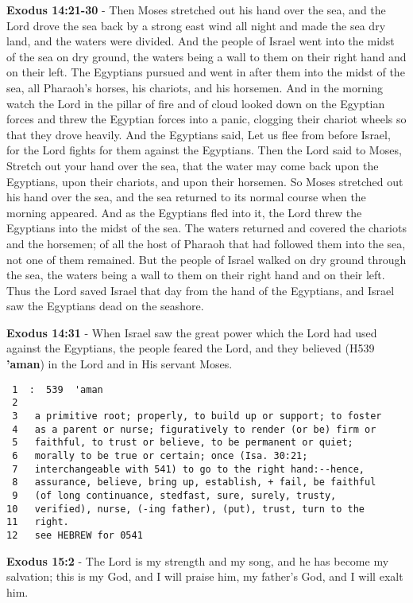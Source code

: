 \documentclass[11pt]{article}
\begin{document}
\textbf{Exodus 14:21-30} - Then Moses stretched out his hand over the sea, and the Lord drove the sea back by a strong east wind all night and made the sea dry land, and the waters were divided. And the people of Israel went into the midst of the sea on dry ground, the waters being a wall to them on their right hand and on their left. The Egyptians pursued and went in after them into the midst of the sea, all Pharaoh's horses, his chariots, and his horsemen. And in the morning watch the Lord in the pillar of fire and of cloud looked down on the Egyptian forces and threw the Egyptian forces into a panic, clogging their chariot wheels so that they drove heavily. And the Egyptians said, Let us flee from before Israel, for the Lord fights for them against the Egyptians. Then the Lord said to Moses, Stretch out your hand over the sea, that the water may come back upon the Egyptians, upon their chariots, and upon their horsemen. So Moses stretched out his hand over the sea, and the sea returned to its normal course when the morning appeared. And as the Egyptians fled into it, the Lord threw the Egyptians into the midst of the sea. The waters returned and covered the chariots and the horsemen; of all the host of Pharaoh that had followed them into the sea, not one of them remained. But the people of Israel walked on dry ground through the sea, the waters being a wall to them on their right hand and on their left. Thus the Lord saved Israel that day from the hand of the Egyptians, and Israel saw the Egyptians dead on the seashore.

\textbf{Exodus 14:31} - When Israel saw the great power which the Lord had used against the Egyptians, the people feared the Lord, and they believed (H539 \textbf{'aman}) in the Lord and in His servant Moses.

\begin{verbatim}
 1  :  539  'aman
 2  
 3   a primitive root; properly, to build up or support; to foster
 4   as a parent or nurse; figuratively to render (or be) firm or
 5   faithful, to trust or believe, to be permanent or quiet;
 6   morally to be true or certain; once (Isa. 30:21;
 7   interchangeable with 541) to go to the right hand:--hence,
 8   assurance, believe, bring up, establish, + fail, be faithful
 9   (of long continuance, stedfast, sure, surely, trusty,
10   verified), nurse, (-ing father), (put), trust, turn to the
11   right.
12   see HEBREW for 0541
\end{verbatim}

\textbf{Exodus 15:2} - The Lord is my strength and my song, and he has become my salvation; this is my God, and I will praise him, my father's God, and I will exalt him.
\end{document}
